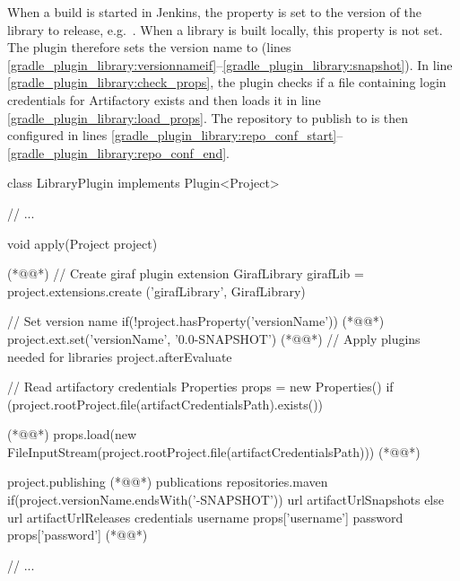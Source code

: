 When a build is started in Jenkins, the  property is set to the version of the library to release, e.g.\ . When a library is built locally, this property is not set. The plugin therefore sets the version name to  (lines \ref{gradle_plugin_library:versionnameif}--\ref{gradle_plugin_library:snapshot}). In line \ref{gradle_plugin_library:check_props}, the plugin checks if a file containing login credentials for Artifactory exists and then loads it in line \ref{gradle_plugin_library:load_props}. The repository to publish to is then configured in lines \ref{gradle_plugin_library:repo_conf_start}--\ref{gradle_plugin_library:repo_conf_end}.

\begin{gradlecode}[float=tbp,caption=Part of Gradle Plugin to publish libraries (in Groovy language),label=lst:gradle_plugin_library]
class LibraryPlugin implements Plugin<Project> {
  // ...

  void apply(Project project) { (*@\label{gradle_plugin_library:arg}@*)
    // Create giraf plugin extension
    GirafLibrary girafLib = project.extensions.create ('girafLibrary', GirafLibrary)

    // Set version name
    if(!project.hasProperty('versionName')) { (*@\label{gradle_plugin_library:versionnameif}@*)
      project.ext.set('versionName', '0.0-SNAPSHOT') (*@\label{gradle_plugin_library:snapshot}@*)
    }
    // Apply plugins needed for libraries
    project.afterEvaluate {
      // Read artifactory credentials
      Properties props = new Properties()
      if (project.rootProject.file(artifactCredentialsPath).exists()) { (*@\label{gradle_plugin_library:check_props}@*)
        props.load(new FileInputStream(project.rootProject.file(artifactCredentialsPath))) (*@\label{gradle_plugin_library:load_props}@*)

        project.publishing { (*@\label{gradle_plugin_library:repo_conf_start}@*)
          publications {
            repositories.maven {
              if(project.versionName.endsWith('-SNAPSHOT')) {
                url artifactUrlSnapshots
              } else {
                url artifactUrlReleases
              }
              credentials {
                username props['username']
                password props['password']
              } (*@\label{gradle_plugin_library:repo_conf_end}@*)
            }
          }
        }
      }

      // ...
    }
  }
}
\end{gradlecode}

